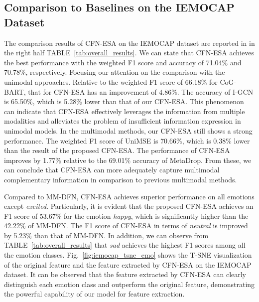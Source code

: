 \documentclass[journal]{IEEEtran}
\begin{document}
\subsection{Comparison to Baselines on the IEMOCAP Dataset}
The comparison results of CFN-ESA on the IEMOCAP dataset are reported in in the right half TABLE~\ref{tab:overall_results}. We can state that CFN-ESA achieves the best performance with the weighted F1 score and accuracy of 71.04\% and 70.78\%, respectively. Focusing our attention on the comparison with the unimodal approaches. Relative to the weighted F1 score of 66.18\% for CoG-BART, that for CFN-ESA has an improvement of 4.86\%. The accuracy of I-GCN is 65.50\%, which is 5.28\% lower than that of our CFN-ESA. This phenomenon can indicate that CFN-ESA effectively leverages the information from multiple modalities and alleviates the problem of insufficient information expression in unimodal models. In the multimodal methods, our CFN-ESA still shows a strong performance. The weighted F1 score of UniMSE is 70.66\%, which is 0.38\% lower than the result of the proposed CFN-ESA. The performance of CFN-ESA improves by 1.77\% relative to the 69.01\% accuracy of MetaDrop. From these, we can conclude that CFN-ESA can more adequately capture multimodal complementary information in comparison to previous multimodal methods.

Compared to MM-DFN, CFN-ESA achieves superior performance on all emotions except \textit{excited}. Particularly, it is evident that the proposed CFN-ESA achieves an F1 score of 53.67\% for the emotion \textit{happy}, which is significantly higher than the 42.22\% of MM-DFN. The F1 score of CFN-ESA in terms of \textit{neutral} is improved by 5.23\% than that of MM-DFN. In addition, we can observe from TABLE~\ref{tab:overall_results} that \textit{sad} achieves the highest F1 scores among all the emotion classes. Fig.~\ref{fig:iemocap_tsne_emo} shows the T-SNE visualization of the original feature and the feature extracted by CFN-ESA on the IEMOCAP dataset. It can be observed that the feature extracted by CFN-ESA can clearly distinguish each emotion class and outperform the original feature, demonstrating the powerful capability of our model for feature extraction.
\begin{figure*}[htbp]
    \centering
    \hfil
    \caption{Comparison of T-SNE visualization before and after feature extraction is performed by employing CFN-ESA on the IEMOCAP dataset.}
    \label{fig:iemocap_tsne_emo}
\end{figure*}
\end{document}
